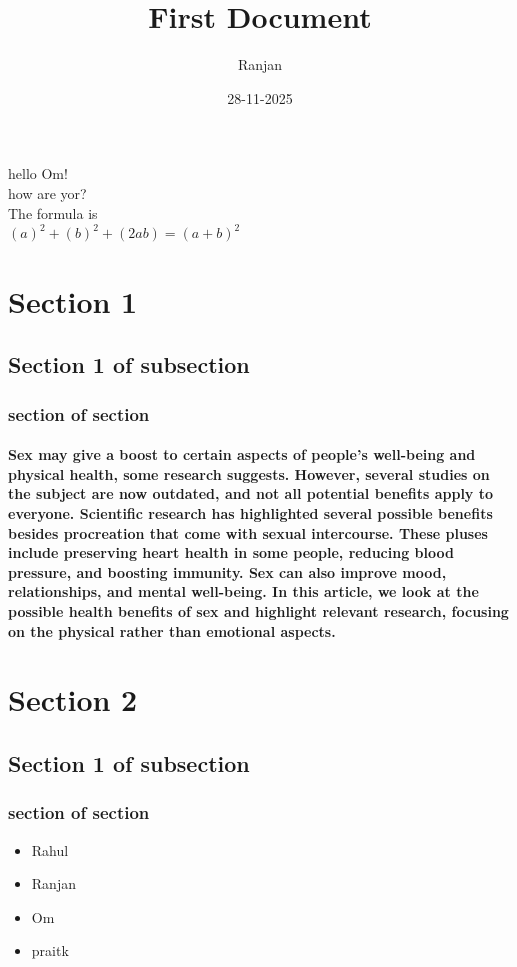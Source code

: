 \documentclass[a4paper,12pt]{article}
\title{First Document}
\author{Ranjan}
\date{28-11-2025}
\begin{document}
\maketitle
\newpage
\centering
 hello Om!\\
how are yor?\\
The formula is \\
$(a)^2+(b)^2 + (2ab)=(a+b)^2$
\newline
\newpage

\tableofcontents
\newpage
\section{Section 1}
\subsection{Section 1 of subsection}
\subsubsection{section of section}
\centering
\paragraph{Sex may give a boost to certain aspects of people’s well-being and physical health, some research suggests. However, several studies on the subject are now outdated, and not all potential benefits apply to everyone.
Scientific research has highlighted several possible benefits besides procreation that come with sexual intercourse. These pluses include preserving heart health in some people, reducing blood pressure, and boosting immunity.
Sex can also improve mood, relationships, and mental well-being.
In this article, we look at the possible health benefits of sex and highlight relevant research, focusing on the physical rather than emotional aspects.}
\newpage
\section{Section 2}
\subsection{Section 1 of subsection}
\subsubsection{section of section}
\begin{itemize}
    \item Rahul
    \item Ranjan
    \item Om
    \item praitk
\end{itemize}
\newpage
\end{document}
